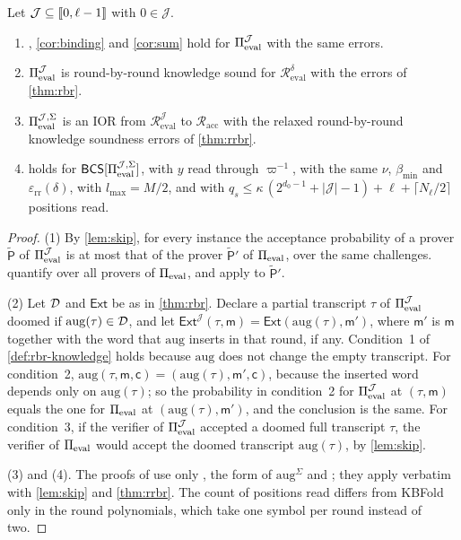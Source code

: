 \begin{theorem}\label{thm:skip}
Let $\mathcal{J} \subseteq \llbracket 0, \ell-1 \rrbracket$ with $0 \in \mathcal{J}$.
\begin{enumerate}
  \item {}, \cref{cor:binding} and \cref{cor:sum} hold for $\Pi_{\mathrm{eval}}^{\mathcal{J}}$ with the same errors.
  \item $\Pi_{\mathrm{eval}}^{\mathcal{J}}$ is round-by-round knowledge sound for $\mathcal{R}^{\delta}_{\mathrm{eval}}$ with the errors of \cref{thm:rbr}.
  \item $\Pi_{\mathrm{eval}}^{\mathcal{J},\Sigma}$ is an IOR from $\mathcal{R}^{\mathcal{J}}_{\mathrm{eval}}$ to $\mathcal{R}_{\mathrm{acc}}$ with the relaxed round-by-round knowledge soundness errors of \cref{thm:rrbr}.
  \item {} holds for $\mathsf{BCS}[\Pi_{\mathrm{eval}}^{\mathcal{J},\Sigma}]$, with $y$ read through $\varpi^{-1}$, with the same $\nu$, $\beta_{\min}$ and $\varepsilon_{\mathrm{rr}}(\delta)$, with $l_{\max} = M/2$, and with $q_s \le \kappa\,(2^{d_0 - 1} + |\mathcal{J}| - 1) + \ell + \lceil N_\ell/2 \rceil$ positions read.
\end{enumerate}
\end{theorem}

\begin{proof}
(1) By \cref{lem:skip}, for every instance the acceptance probability of a prover $\tilde{\mathsf{P}}$ of $\Pi_{\mathrm{eval}}^{\mathcal{J}}$ is at most that of the prover $\tilde{\mathsf{P}}'$ of $\Pi_{\mathrm{eval}}$, over the same challenges.  quantify over all provers of $\Pi_{\mathrm{eval}}$, and apply to $\tilde{\mathsf{P}}'$.

(2) Let $\mathcal{D}$ and $\mathsf{Ext}$ be as in \cref{thm:rbr}. Declare a partial transcript $\tau$ of $\Pi_{\mathrm{eval}}^{\mathcal{J}}$ doomed if $\mathrm{aug}(\tau) \in \mathcal{D}$, and let $\mathsf{Ext}^{\mathcal{J}}(\tau, \mathsf{m}) = \mathsf{Ext}(\mathrm{aug}(\tau), \mathsf{m}')$, where $\mathsf{m}'$ is $\mathsf{m}$ together with the word that $\mathrm{aug}$ inserts in that round, if any.
Condition~1 of \cref{def:rbr-knowledge} holds because $\mathrm{aug}$ does not change the empty transcript.
For condition~2, $\mathrm{aug}(\tau, \mathsf{m}, \mathsf{c}) = (\mathrm{aug}(\tau), \mathsf{m}', \mathsf{c})$, because the inserted word depends only on $\mathrm{aug}(\tau)$; so the probability in condition~2 for $\Pi_{\mathrm{eval}}^{\mathcal{J}}$ at $(\tau, \mathsf{m})$ equals the one for $\Pi_{\mathrm{eval}}$ at $(\mathrm{aug}(\tau), \mathsf{m}')$, and the conclusion is the same.
For condition~3, if the verifier of $\Pi_{\mathrm{eval}}^{\mathcal{J}}$ accepted a doomed full transcript $\tau$, the verifier of $\Pi_{\mathrm{eval}}$ would accept the doomed transcript $\mathrm{aug}(\tau)$, by \cref{lem:skip}.

(3) and (4). The proofs of  use only , the form of $\mathrm{aug}^{\Sigma}$ and ; they apply verbatim with \cref{lem:skip} and \cref{thm:rrbr}.
The count of positions read differs from KBFold only in the round polynomials, which take one symbol per round instead of two.
\end{proof}

